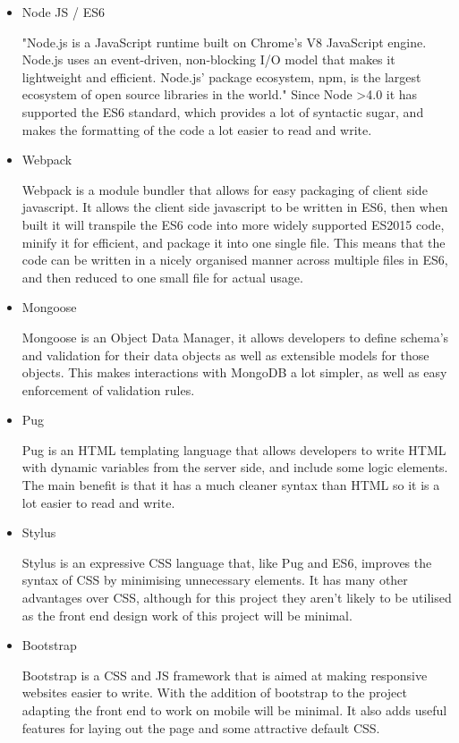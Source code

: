 \begin{itemize}
  \item Node JS / ES6

    "Node.js is a JavaScript runtime built on Chrome's V8 JavaScript engine. Node.js uses an event-driven, non-blocking I/O model that makes it lightweight and efficient. Node.js' package ecosystem, npm, is the largest ecosystem of open source libraries in the world."\cite{https://nodejs.org}
    Since Node >4.0 it has supported the ES6 standard, which provides a lot of syntactic sugar, and makes the formatting of the code a lot easier to read and write. 
  \item Webpack
    
    Webpack is a module bundler that allows for easy packaging of client side javascript. It allows the client side javascript to be written in ES6, then when built it will transpile the ES6 code into more widely supported ES2015 code, minify it for efficient, and package it into one single file. This means that the code can be written in a nicely organised manner across multiple files in ES6, and then reduced to one small file for actual usage. 

  \item Mongoose

    Mongoose is an Object Data Manager, it allows developers to define schema's and validation for their data objects as well as extensible models for those objects. This makes interactions with MongoDB a lot simpler, as well as easy enforcement of validation rules.

  \item Pug

    Pug is an HTML templating language that allows developers to write HTML with dynamic variables from the server side, and include some logic elements. The main benefit is that it has a much cleaner syntax than HTML so it is a lot easier to read and write. 

  \item Stylus

    Stylus is an expressive CSS language that, like Pug and ES6, improves the syntax of CSS by minimising unnecessary elements. It has many other advantages over CSS, although for this project they aren't likely to be utilised as the front end design work of this project will be minimal. 

  \item Bootstrap

    Bootstrap is a CSS and JS framework that is aimed at making responsive websites easier to write. With the addition of bootstrap to the project adapting the front end to work on mobile will be minimal. It also adds useful features for laying out the page and some attractive default CSS. 
\end{itemize}


